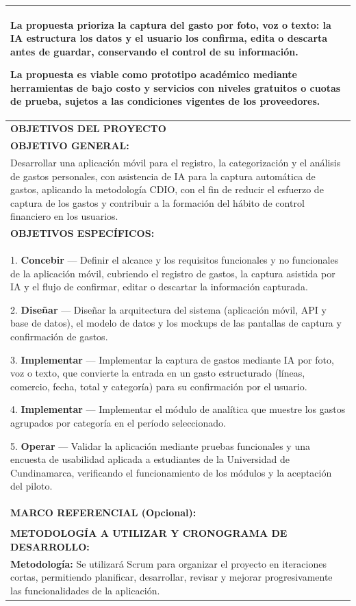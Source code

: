 \documentclass[11pt]{article}
\newcommand{\formlabel}[1]{\textbf{\small #1}}
\newcommand{\formcell}[1]{\small #1}
\begin{document}
\begin{longtable}{|p{15.38cm}|}
{La propuesta prioriza la captura del gasto por foto, voz o texto: la IA estructura los datos y el usuario los confirma, edita o descarta antes de guardar, conservando el control de su información.

La propuesta es viable como prototipo académico mediante herramientas de bajo costo y servicios con niveles gratuitos o cuotas de prueba, sujetos a las condiciones vigentes de los proveedores.} \\
\hline
\formlabel{OBJETIVOS DEL PROYECTO} \\
\hline
\formlabel{OBJETIVO GENERAL:} \\
\hline
\formcell{Desarrollar una aplicación móvil para el registro, la categorización y el análisis de gastos personales, con asistencia de IA para la captura automática de gastos, aplicando la metodología CDIO, con el fin de reducir el esfuerzo de captura de los gastos y contribuir a la formación del hábito de control financiero en los usuarios.} \\
\hline
\formlabel{OBJETIVOS ESPECÍFICOS:} \\
\hline
\formcell{1. \textbf{Concebir} — Definir el alcance y los requisitos funcionales y no funcionales de la aplicación móvil, cubriendo el registro de gastos, la captura asistida por IA y el flujo de confirmar, editar o descartar la información capturada.

\vspace{0.12cm}

2. \textbf{Diseñar} — Diseñar la arquitectura del sistema (aplicación móvil, API y base de datos), el modelo de datos y los mockups de las pantallas de captura y confirmación de gastos.

\vspace{0.12cm}

3. \textbf{Implementar} — Implementar la captura de gastos mediante IA por foto, voz o texto, que convierte la entrada en un gasto estructurado (líneas, comercio, fecha, total y categoría) para su confirmación por el usuario.

\vspace{0.12cm}

4. \textbf{Implementar} — Implementar el módulo de analítica que muestre los gastos agrupados por categoría en el período seleccionado.

\vspace{0.12cm}

5. \textbf{Operar} — Validar la aplicación mediante pruebas funcionales y una encuesta de usabilidad aplicada a estudiantes de la Universidad de Cundinamarca, verificando el funcionamiento de los módulos y la aceptación del piloto.} \\
\hline
\formlabel{MARCO REFERENCIAL (Opcional):} \\
\hline
\rule{0pt}{0.35cm} \\
\hline
\formlabel{METODOLOGÍA A UTILIZAR Y CRONOGRAMA DE DESARROLLO:} \\
\hline
\formcell{\textbf{Metodología:} Se utilizará Scrum para organizar el proyecto en iteraciones cortas, permitiendo planificar, desarrollar, revisar y mejorar progresivamente las funcionalidades de la aplicación.

}
\end{longtable}
\end{document}
